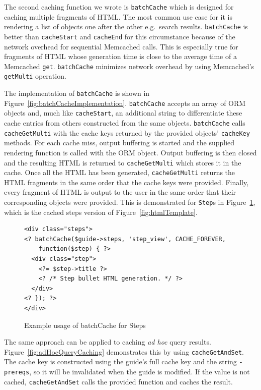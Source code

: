 \documentclass[12pt]{ucthesis}
\begin{document}
The second caching function we wrote is {\tt batchCache} which is designed for caching multiple fragments of HTML\@.
The most common use case for it is rendering a list of objects one after the other e.g.\ search results.
{\tt batchCache} is better than {\tt cacheStart} and {\tt cacheEnd} for this circumstance because of the network overhead for sequential \textsf{Memcached} calls.
This is especially true for fragments of HTML whose generation time is close to the average time of a \textsf{Memcached} {\tt get}.
{\tt batchCache} minimizes network overhead by using \textsf{Memcached}'s {\tt getMulti} operation.

The implementation of {\tt batchCache} is shown in Figure~\ref{fig:batchCacheImplementation}.
{\tt batchCache} accepts an array of ORM objects and, much like {\tt cacheStart}, an additional string to differentiate these cache entries from others constructed from the same objects.
{\tt batchCache} calls {\tt cacheGetMulti} with the cache keys returned by the provided objects' {\tt cacheKey} methods.
For each cache miss, output buffering is started and the supplied rendering function is called with the ORM object.
Output buffering is then closed and the resulting HTML is returned to {\tt cacheGetMulti} which stores it in the cache.
Once all the HTML has been generated, {\tt cacheGetMulti} returns the HTML fragments in the same order that the cache keys were provided.
Finally, every fragment of HTML is output to the user in the same order that their corresponding objects were provided.
This is demonstrated for {\tt Step}s in Figure~\ref{fig:batchCacheStep}, which is the cached steps version of Figure~\ref{fig:htmlTemplate}.

\begin{figure}[h]
\begin{ssp}
\begin{verbatim}
<div class="steps">
<? batchCache($guide->steps, 'step_view', CACHE_FOREVER,
    function($step) { ?>
  <div class="step">
    <?= $step->title ?>
    <? /* Step bullet HTML generation. */ ?>
  </div>
<? }); ?>
</div>
\end{verbatim}
\caption{Example usage of batchCache for Steps}
\label{fig:batchCacheStep}
\end{ssp}
\end{figure}

The same approach can be applied to caching \textit{ad hoc} query results.
Figure~\ref{fig:adHocQueryCaching} demonstrates this by using {\tt cacheGetAndSet}.
The cache key is constructed using the guide's full cache key and the string {\tt -prereqs}, so it will be invalidated when the guide is modified.
If the value is not cached, {\tt cacheGetAndSet} calls the provided function and caches the result.
\end{document}
